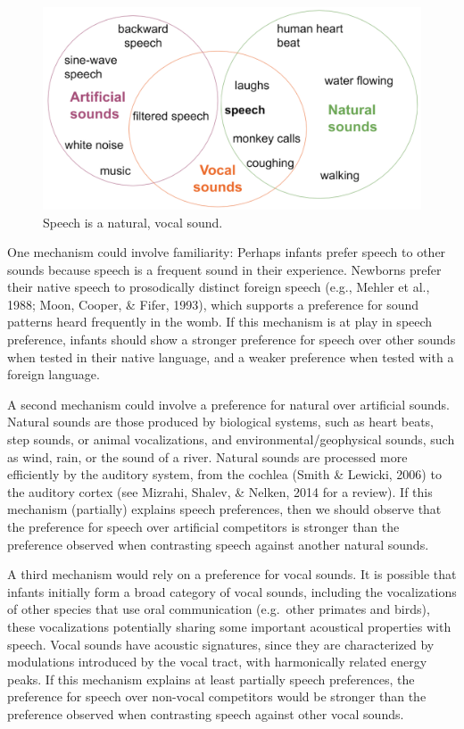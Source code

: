 \documentclass[
  man]{apa6}
\begin{document}
\begin{figure}
\centering
\includegraphics{figures_intro/Venn.png}
\caption{\label{fig:venn}Speech is a natural, vocal sound.}
\end{figure}

One mechanism could involve familiarity: Perhaps infants prefer speech to other sounds because speech is a frequent sound in their experience. Newborns prefer their native speech to prosodically distinct foreign speech (e.g., Mehler et al., 1988; Moon, Cooper, \& Fifer, 1993), which supports a preference for sound patterns heard frequently in the womb. If this mechanism is at play in speech preference, infants should show a stronger preference for speech over other sounds when tested in their native language, and a weaker preference when tested with a foreign language.

A second mechanism could involve a preference for natural over artificial sounds. Natural sounds are those produced by biological systems, such as heart beats, step sounds, or animal vocalizations, and environmental/geophysical sounds, such as wind, rain, or the sound of a river. Natural sounds are processed more efficiently by the auditory system, from the cochlea (Smith \& Lewicki, 2006) to the auditory cortex (see Mizrahi, Shalev, \& Nelken, 2014 for a review). If this mechanism (partially) explains speech preferences, then we should observe that the preference for speech over artificial competitors is stronger than the preference observed when contrasting speech against another natural sounds.

A third mechanism would rely on a preference for vocal sounds. It is possible that infants initially form a broad category of vocal sounds, including the vocalizations of other species that use oral communication (e.g.~other primates and birds), these vocalizations potentially sharing some important acoustical properties with speech. Vocal sounds have acoustic signatures, since they are characterized by modulations introduced by the vocal tract, with harmonically related energy peaks. If this mechanism explains at least partially speech preferences, the preference for speech over non-vocal competitors would be stronger than the preference observed when contrasting speech against other vocal sounds.
\end{document}
